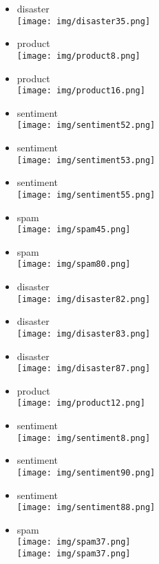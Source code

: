 \documentclass{article}
\theoremstyle{definition}
\theoremstyle{remark}
\begin{document}
\begin{landscape}
\newpage

\begin{itemize}
    \item disaster\\\texttt{[image: img/disaster35.png]}
    \item product\\\texttt{[image: img/product8.png]}
    \item product\\\texttt{[image: img/product16.png]}
    \item sentiment\\\texttt{[image: img/sentiment52.png]}
    \item sentiment\\\texttt{[image: img/sentiment53.png]}
    \item sentiment\\\texttt{[image: img/sentiment55.png]}
    \item spam\\\texttt{[image: img/spam45.png]}
    \item spam\\\texttt{[image: img/spam80.png]}
\end{itemize}

\newpage

\begin{itemize}
    \item disaster\\\texttt{[image: img/disaster82.png]}
    \item disaster\\\texttt{[image: img/disaster83.png]}
    \item disaster\\\texttt{[image: img/disaster87.png]}
    \item product\\\texttt{[image: img/product12.png]}
    \item sentiment\\\texttt{[image: img/sentiment8.png]}
    \item sentiment\\\texttt{[image: img/sentiment90.png]}
    \item sentiment\\\texttt{[image: img/sentiment88.png]}
    \item spam\\\texttt{[image: img/spam37.png]}\\
        \texttt{[image: img/spam37.png]}
\end{itemize}


\end{landscape}
\end{document}

